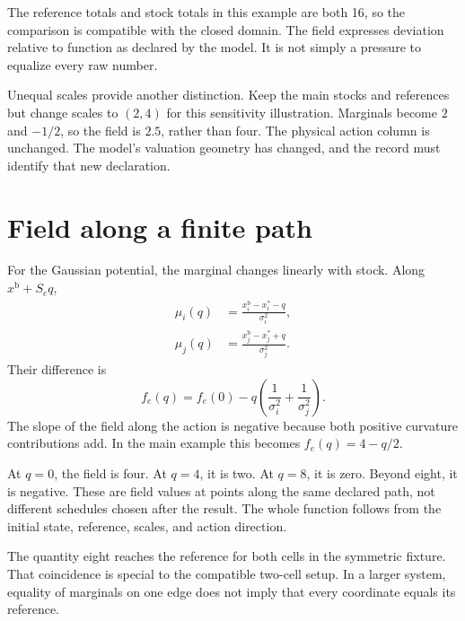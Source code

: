 The reference totals and stock totals in this example are both 16, so the comparison is compatible with the closed domain. The field expresses deviation relative to function as declared by the model. It is not simply a pressure to equalize every raw number.

Unequal scales provide another distinction. Keep the main stocks and references but change scales to \((2,4)\) for this sensitivity illustration. Marginals become \(2\) and \(-1/2\), so the field is \(2.5\), rather than four. The physical action column is unchanged. The model's valuation geometry has changed, and the record must identify that new declaration.

\section{Field along a finite path}
For the Gaussian potential, the marginal changes linearly with stock. Along \(x^{\mathrm{b}}+S_eq\),
\begin{align}
 \mu_i(q)&=\frac{x^{\mathrm{b}}_i-x_i^*-q}{\sigma_i^2},\\
 \mu_j(q)&=\frac{x^{\mathrm{b}}_j-x_j^*+q}{\sigma_j^2}.
\end{align}
Their difference is
\begin{equation}\label{eq:field-along-edge}
 f_e(q)=f_e(0)-q\left(\frac1{\sigma_i^2}+\frac1{\sigma_j^2}\right).
\end{equation}
The slope of the field along the action is negative because both positive curvature contributions add. In the main example this becomes \(f_e(q)=4-q/2\).

At \(q=0\), the field is four. At \(q=4\), it is two. At \(q=8\), it is zero. Beyond eight, it is negative. These are field values at points along the same declared path, not different schedules chosen after the result. The whole function follows from the initial state, reference, scales, and action direction.

The quantity eight reaches the reference for both cells in the symmetric fixture. That coincidence is special to the compatible two-cell setup. In a larger system, equality of marginals on one edge does not imply that every coordinate equals its reference.


